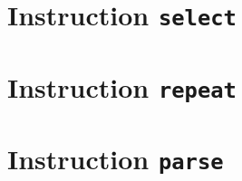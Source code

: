 \section{Instruction \texttt{select}}








\section{Instruction \texttt{repeat}}







\section{Instruction \texttt{parse}}











